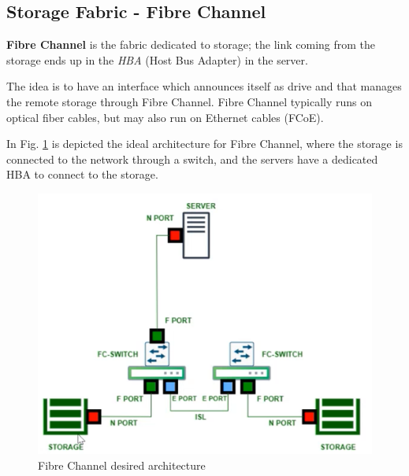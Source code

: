 \subsection{Storage Fabric - Fibre Channel}
\textbf{Fibre Channel} is the fabric dedicated to storage; the link coming from the storage ends up in the \textit{HBA} (Host Bus Adapter) in the server.
\begin{paracol}{2}

   \colfill
   The idea is to have an interface which announces itself as drive and that manages the remote storage through Fibre Channel.
   Fibre Channel typically runs on optical fiber cables, but may also run on Ethernet cables (FCoE).

   In Fig. \ref{fig:fibrechannel} is depicted the ideal architecture for Fibre Channel, where the storage is connected to the network through a switch, and the servers have a dedicated HBA to connect to the storage.
   \colfill
   
   \switchcolumn
   \begin{figure}[htbp]
      \centering
      \includegraphics{images/fibrechannel.png}
      \caption{Fibre Channel desired architecture}
      \label{fig:fibrechannel}
   \end{figure}
   
\end{paracol}


